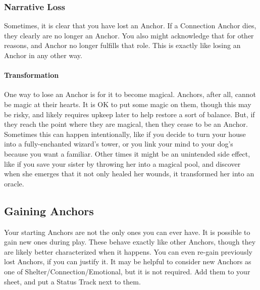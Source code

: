 \documentclass[
  oneside,
  statementpaper,
  9pt]{memoir}
\begin{document}
\hypertarget{narrative-loss}{%
\subsubsection{Narrative Loss}\label{narrative-loss}}

\begin{Player}

Sometimes, it is clear that you have lost an Anchor. If a Connection Anchor dies, they clearly are no longer an Anchor. You also might acknowledge that for other reasons, and Anchor no longer fulfills that role. This is exactly like losing an Anchor in any other way.

\end{Player}

\hypertarget{transformation}{%
\paragraph{Transformation}\label{transformation}}

\begin{Player}

One way to lose an Anchor is for it to become magical. Anchors, after all, cannot be magic at their hearts. It is OK to put some magic on them, though this may be risky, and likely requires upkeep later to help restore a sort of balance. But, if they reach the point where they are magical, then they cease to be an Anchor. Sometimes this can happen intentionally, like if you decide to turn your house into a fully-enchanted wizard’s tower, or you link your mind to your dog’s because you want a familiar. Other times it might be an unintended side effect, like if you save your sister by throwing her into a magical pool, and discover when she emerges that it not only healed her wounds, it transformed her into an oracle.

\end{Player}

\hypertarget{gaining-anchors}{%
\subsection{Gaining Anchors}\label{gaining-anchors}}

\begin{Player}

Your starting Anchors are not the only ones you can ever have. It is possible to gain new ones during play. These behave exactly like other Anchors, though they are likely better characterized when it happens. You can even re-gain previously lost Anchors, if you can justify it. It may be helpful to consider new Anchors as one of Shelter/Connection/Emotional, but it is not required. Add them to your sheet, and put a Status Track next to them.

\end{Player}
\end{document}
